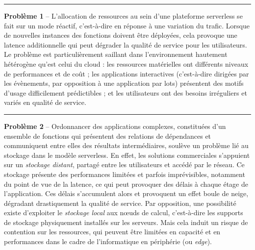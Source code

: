 \begin{center}
    \rule{4cm}{0.4pt}
\end{center}

\textbf{Problème 1} -- L'allocation de ressources au sein d'une plateforme serverless se fait sur un mode réactif, c'est-à-dire en réponse à une variation du trafic. Lorsque de nouvelles instances des fonctions doivent être déployées, cela provoque une latence additionnelle qui peut dégrader la qualité de service pour les utilisateurs. Le problème est particulièrement saillant dans l'environnement hautement hétérogène qu'est celui du cloud : les ressources matérielles ont différents niveaux de performances et de coût ; les applications interactives (c'est-à-dire dirigées par les évènements, par opposition à une application par lots) présentent des motifs d'usage difficilement prédictibles ; et les utilisateurs ont des besoins irréguliers et variés en qualité de service.


\begin{center}
    \rule{4cm}{0.4pt}
\end{center}

\textbf{Problème 2} -- Ordonnancer des applications complexes, constituées d'un ensemble de fonctions qui présentent des relations de dépendances et communiquent entre elles des résultats intermédiaires, soulève un problème lié au stockage dans le modèle serverless. En effet, les solutions commerciales s'appuient sur un \textit{stockage distant}, partagé entre les utilisateurs et accédé par le réseau. Ce stockage présente des performances limitées et parfois imprévisibles, notamment du point de vue de la latence, ce qui peut provoquer des délais à chaque étage de l'application. Ces délais s'accumulent alors et provoquent un effet boule de neige, dégradant drastiquement la qualité de service. Par opposition, une possibilité existe d'exploiter le \textit{stockage local} aux nœuds de calcul, c'est-à-dire les supports de stockage physiquement installés sur les serveurs. Mais cela induit un risque de contention sur les ressources, qui peuvent être limitées en capacité et en performances dans le cadre de l'informatique en périphérie (ou \textit{edge}).

